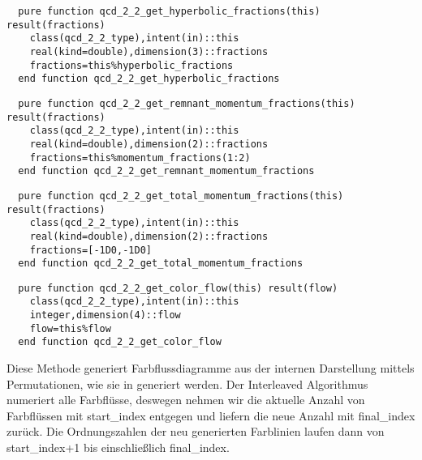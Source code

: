 \begin{Verbatim}
  pure function qcd_2_2_get_hyperbolic_fractions(this) result(fractions)
    class(qcd_2_2_type),intent(in)::this
    real(kind=double),dimension(3)::fractions
    fractions=this%hyperbolic_fractions
  end function qcd_2_2_get_hyperbolic_fractions
\end{Verbatim}

\begin{Verbatim}
  pure function qcd_2_2_get_remnant_momentum_fractions(this) result(fractions)
    class(qcd_2_2_type),intent(in)::this
    real(kind=double),dimension(2)::fractions
    fractions=this%momentum_fractions(1:2)
  end function qcd_2_2_get_remnant_momentum_fractions
\end{Verbatim}


\begin{Verbatim}
  pure function qcd_2_2_get_total_momentum_fractions(this) result(fractions)
    class(qcd_2_2_type),intent(in)::this
    real(kind=double),dimension(2)::fractions
    fractions=[-1D0,-1D0]
  end function qcd_2_2_get_total_momentum_fractions
\end{Verbatim}

\begin{Verbatim}
  pure function qcd_2_2_get_color_flow(this) result(flow)
    class(qcd_2_2_type),intent(in)::this
    integer,dimension(4)::flow
    flow=this%flow
  end function qcd_2_2_get_color_flow
\end{Verbatim}

Diese Methode generiert Farbflussdiagramme aus der internen Darstellung mittels Permutationen, wie sie in  generiert werden. Der Interleaved Algorithmus numeriert alle Farbflüsse, deswegen nehmen wir die aktuelle Anzahl von Farbflüssen mit start\_index entgegen und liefern die neue Anzahl mit final\_index zurück. Die Ordnungszahlen der neu generierten Farblinien laufen dann von start\_index+1 bis einschließlich final\_index.

